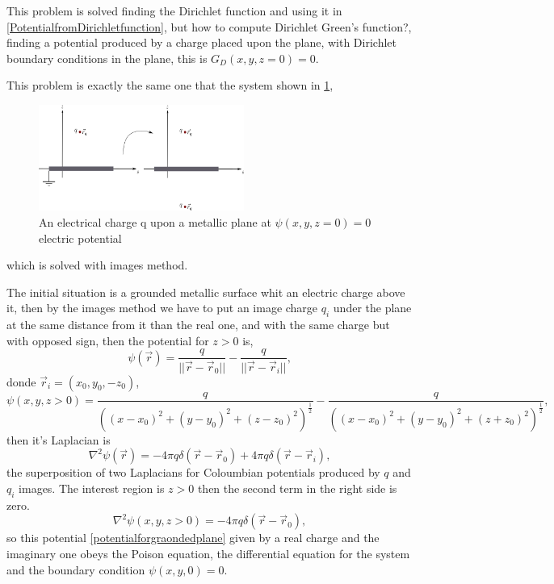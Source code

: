\documentclass[12pt,a4paper]{article}
\begin{document}
This problem is solved finding the Dirichlet function and using it in \eqref{PotentialfromDirichletfunction}, but how to compute Dirichlet Green's function?, finding a potential produced by a charge placed upon the plane, with Dirichlet boundary conditions in the plane, this is $G_{D}(x,y,z=0)=0$.

This problem is exactly the same one that the system shown in \ref{Imagemethod},
 \begin{figure}
 	\centering
 	\includegraphics[width=0.6\textwidth]{figs/Imagemethod.png}
 	\caption{An electrical charge q upon a metallic plane at $\psi(x,y,z=0)=0$ electric potential}
 	\label{Imagemethod}
 \end{figure}
 which is solved with images method. 
 
The initial situation is a grounded metallic surface whit an electric charge above it, then by the images method we have to put an image charge $q_{i}$ under the plane at the same distance from it than the real one, and with the same charge but with opposed sign, then the potential for $z>0$ is,
\begin{equation}
	\label{potentialforgraondedplane}
	\psi(\vec{r})=\frac{q}{||\vec{r}-\vec{r}_{0}||}-\frac{q}{||\vec{r}-\vec{r}_{i}||},
\end{equation}
donde $\vec{r}_{i}=(x_{0},y_{0},-z_{0})$,
\[\psi(x,y,z>0)=\frac{q}{((x-x_{0})^{2}+(y-y_{0})^{2}+(z-z_{0})^{2})^{\frac{1}{2}}}-\frac{q}{((x-x_{0})^{2}+(y-y_{0})^{2}+(z+z_{0})^{2})^{\frac{1}{2}}},\]
then it's Laplacian is 
\begin{equation}
\nabla ^{2}\psi(\vec{r})=-4\pi q\delta(\vec{r}-\vec{r}_{0})+4\pi q\delta(\vec{r}-\vec{r}_{i}),
\end{equation}
the superposition of two Laplacians for Coloumbian potentials produced by $q$ and $q_{i}$ images. The interest region is $z>0$ then the second term in the right side is zero.
\begin{equation}
	\nabla ^{2}\psi(x,y,z>0)=-4\pi q\delta(\vec{r}-\vec{r}_{0}),
\end{equation}
so this potential \eqref{potentialforgraondedplane} given by a real charge and the imaginary one obeys the Poison equation, the differential equation for the system and the boundary condition $\psi(x,y,0)=0$.
\end{document}

